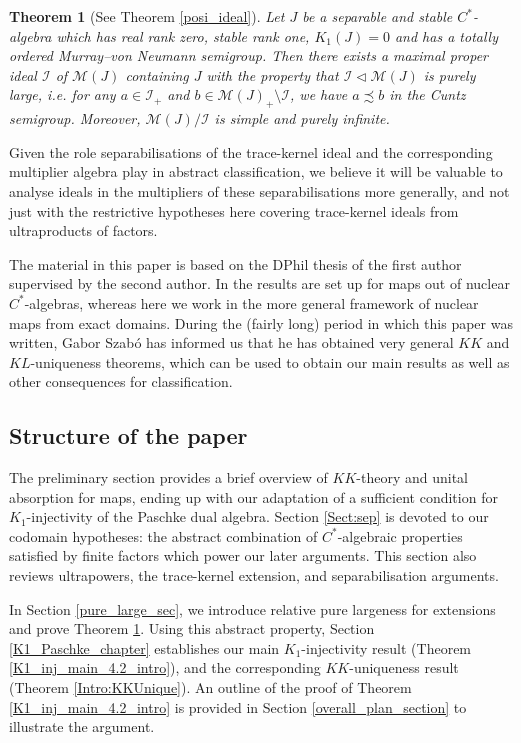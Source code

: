 \documentclass[reqno]{amsart}
\newtheorem{mainthm}{Theorem}
\theoremstyle{definition}
\theoremstyle{remark}
\numberwithin{equation}{section}
\theoremstyle{definition}
\newcommand{\calM}{\mathcal{M}}
\newcommand{\calI}{\mathcal{I}}
\begin{document}
\begin{mainthm}[See Theorem \ref{posi_ideal}] 
\label{pure_large_intro} 
Let $J$ be a separable and stable $C^*$-algebra which has real rank zero, stable rank one, $K_{1}(J) = 0$ and has a totally ordered Murray--von Neumann semigroup. Then there exists a maximal proper ideal $\mathcal I$ of $\calM(J)$ containing $J$ with the property that $\calI\lhd \calM(J)$ is purely large, i.e. for any $a\in \calI_{+}$ and $b\in \calM(J)_{+} \setminus \calI$, we have $a\precsim b$ in the Cuntz semigroup. Moreover, $\calM(J)/\mathcal I$ is simple and purely infinite. 
\end{mainthm} 

Given the role separabilisations of the trace-kernel ideal and the corresponding multiplier algebra play in abstract classification, we believe it will be valuable to analyse ideals in the multipliers of these separabilisations more generally, and not just with the restrictive hypotheses here covering trace-kernel ideals from ultraproducts of factors.

The material in this paper is based on the DPhil thesis of the first author \cite{Hua_thesis} supervised by the second author.  In \cite{Hua_thesis} the results are set up for maps out of nuclear $C^*$-algebras, whereas here we work in the more general framework of nuclear maps from exact domains. During the (fairly long) period in which this paper was written, Gabor Szab\'o has informed us that he has obtained very general $KK$ and $KL$-uniqueness theorems, which can be used to obtain our main results as well as other consequences for classification. 

\subsection*{Structure of the paper} 
The preliminary section provides a brief overview of $KK$-theory and unital absorption for maps, ending up with our adaptation of a sufficient condition for $K_{1}$-injectivity of the Paschke dual algebra. Section \ref{Sect:sep} is devoted to our codomain hypotheses: the abstract combination of $C^*$-algebraic properties satisfied by finite factors which power our later arguments.  This section also reviews ultrapowers, the trace-kernel extension, and separabilisation arguments. 

In Section \ref{pure_large_sec}, we introduce relative pure largeness for extensions and prove Theorem \ref{pure_large_intro}. Using this abstract property, Section \ref{K1_Paschke_chapter} establishes our main $K_{1}$-injectivity result (Theorem \ref{K1_inj_main_4.2_intro}), and the corresponding $KK$-uniqueness result (Theorem \ref{Intro:KKUnique}). An outline of the proof of Theorem \ref{K1_inj_main_4.2_intro} is provided in Section \ref{overall_plan_section} to illustrate the argument. 
\end{document}
